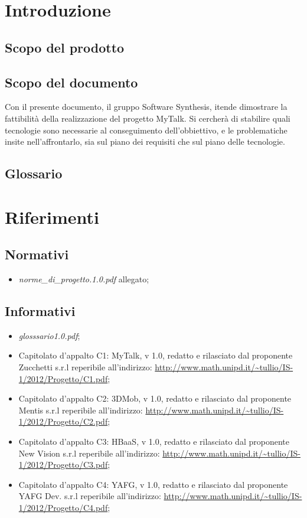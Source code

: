 

\setcounter{page}{1}
\pagestyle{normal}


\section{Introduzione}
\subsection{Scopo del prodotto}
\purpose
\subsection{Scopo del documento}
Con il presente documento, il gruppo Software Synthesis, itende dimostrare la fattibilità della realizzazione del progetto MyTalk. Si cercherà di stabilire quali tecnologie sono necessarie al conseguimento dell'obbiettivo, e le problematiche insite nell'affrontarlo, sia sul piano dei requisiti che sul piano delle tecnologie.
\subsection{Glossario}
\glossaryIntro
\clearpage

\section{Riferimenti}
\subsection{Normativi}
\begin{itemize}
\item[] \textit{norme\_di\_progetto.1.0.pdf} allegato;
\end{itemize}
\subsection{Informativi}
\begin{itemize}
\item[] \textit{glosssario1.0.pdf};
\item[] Capitolato d'appalto C1: MyTalk, v 1.0, redatto e rilasciato dal proponente Zucchetti s.r.l reperibile all'indirizzo: \url{http://www.math.unipd.it/~tullio/IS-1/2012/Progetto/C1.pdf};
\item[] Capitolato d'appalto C2: 3DMob, v 1.0, redatto e rilasciato dal proponente Mentis s.r.l reperibile all'indirizzo: \url{http://www.math.unipd.it/~tullio/IS-1/2012/Progetto/C2.pdf};
\item[] Capitolato d'appalto C3: HBaaS, v 1.0, redatto e rilasciato dal proponente New Vision s.r.l reperibile all'indirizzo: \url{http://www.math.unipd.it/~tullio/IS-1/2012/Progetto/C3.pdf};
\item[] Capitolato d'appalto C4: YAFG, v 1.0, redatto e rilasciato dal proponente YAFG Dev. s.r.l reperibile all'indirizzo: \url{http://www.math.unipd.it/~tullio/IS-1/2012/Progetto/C4.pdf};
\end{itemize}
\clearpage

